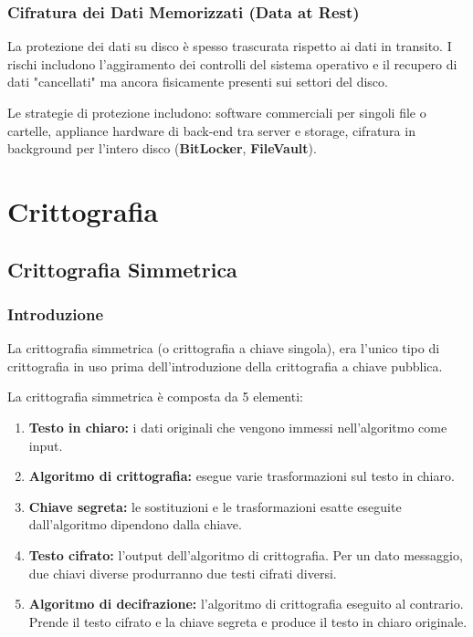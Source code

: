 \subsection{Cifratura dei Dati Memorizzati (Data at Rest)}
La protezione dei dati su disco è spesso trascurata rispetto ai dati in transito. I rischi includono l'aggiramento dei controlli del sistema operativo e il recupero di dati "cancellati" ma ancora fisicamente presenti sui settori del disco.

Le strategie di protezione includono: software commerciali per singoli file o cartelle, appliance hardware di back-end tra server e storage, cifratura in background per l'intero disco (\textbf{BitLocker}, \textbf{FileVault}).

\chapter{Crittografia}

\section{Crittografia Simmetrica}

\subsection{Introduzione}

La crittografia simmetrica (o crittografia a chiave singola), era l'unico tipo di crittografia in uso prima dell'introduzione della crittografia a chiave pubblica.

La crittografia simmetrica è composta da 5 elementi:

\begin{enumerate}
    \item \textbf{Testo in chiaro:} i dati originali che vengono immessi nell'algoritmo come input.
    \item \textbf{Algoritmo di crittografia:} esegue varie trasformazioni sul testo in chiaro.
    \item \textbf{Chiave segreta:} le sostituzioni e le trasformazioni esatte eseguite dall'algoritmo dipendono dalla chiave.
    \item \textbf{Testo cifrato:} l'output dell'algoritmo di crittografia. Per un dato messaggio, due chiavi diverse produrranno due testi cifrati diversi.
    \item \textbf{Algoritmo di decifrazione:} l'algoritmo di crittografia eseguito al contrario. Prende il testo cifrato e la chiave segreta e produce il testo in chiaro originale.
\end{enumerate}

